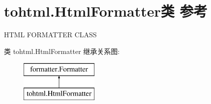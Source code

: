 \hypertarget{classtohtml_1_1_html_formatter}{}\section{tohtml.\+Html\+Formatter类 参考}
\label{classtohtml_1_1_html_formatter}


H\+T\+ML F\+O\+R\+M\+A\+T\+T\+ER C\+L\+A\+SS  


类 tohtml.\+Html\+Formatter 继承关系图\+:\begin{figure}[H]
\begin{center}
\leavevmode
\includegraphics[height=2.000000cm]{classtohtml_1_1_html_formatter}
\end{center}
\end{figure}
